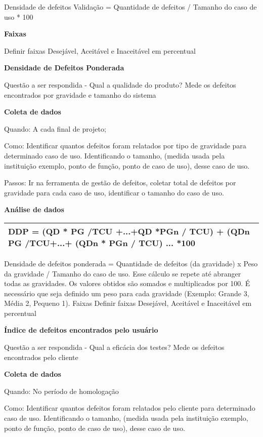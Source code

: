 Densidade de defeitos Validação = Quantidade de defeitos / Tamanho do caso de uso * 100

\textbf{Faixas}

Definir faixas Desejável, Aceitável e Inaceitável em percentual

\textbf{Densidade de Defeitos Ponderada}

Questão a ser respondida - Qual a qualidade do produto? Mede os defeitos encontrados por gravidade e tamanho do sistema

\textbf{Coleta de dados}

Quando: A cada final de projeto;

Como: Identificar quantos defeitos foram relatados por tipo de gravidade para determinado caso de uso. Identificando o tamanho, (medida usada pela instituição exemplo, ponto de função, ponto de caso de uso), desse caso de uso. 

Passos: Ir na ferramenta de gestão de defeitos, coletar total de defeitos por gravidade para cada caso de uso, identificar o tamanho do caso de uso.

\textbf{Análise de dados}

\begin{table}[!ht]
\centering
\begin{tabular}{|p{130mm}|}
\hline
DDP = (QD * PG /TCU +...+QD *PGn / TCU) + (QDn PG /TCU+...+ (QDn * PGn / TCU) ... *100 \\ 
\hline
\end{tabular}
\end{table}

Densidade de defeitos ponderada = Quantidade de defeitos (da gravidade) x Peso da gravidade / Tamanho do caso de uso. Esse cálculo se repete até abranger todas as gravidades. Os valores obtidos são somados e multiplicados por 100. É necessário que seja definido um peso para cada gravidade (Exemplo: Grande 3, Média 2, Pequeno 1). Faixas Definir faixas Desejável, Aceitável e Inaceitável em percentual

\textbf{Índice de defeitos encontrados pelo usuário}

Questão a ser respondida - Qual a eficácia dos testes? Mede os defeitos encontrados pelo cliente

\textbf{Coleta de dados}

Quando: No período de homologação 

Como: Identificar quantos defeitos foram relatados pelo cliente para determinado caso de uso. Identificando o tamanho, (medida usada pela instituição exemplo, ponto de função, ponto de caso de uso), desse caso de uso. 

